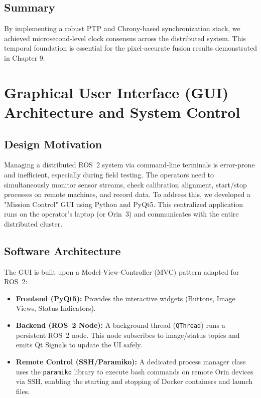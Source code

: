 \documentclass[12pt,a4paper]{report}
\begin{document}
\section{Summary}
By implementing a robust PTP and Chrony-based synchronization stack, we achieved microsecond-level clock consensus across the distributed system. This temporal foundation is essential for the pixel-accurate fusion results demonstrated in Chapter 9.

\chapter{Graphical User Interface (GUI) Architecture and System Control}

\section{Design Motivation}
Managing a distributed ROS~2 system via command-line terminals is error-prone and inefficient, especially during field testing. The operators need to simultaneously monitor sensor streams, check calibration alignment, start/stop processes on remote machines, and record data. To address this, we developed a "Mission Control" GUI using Python and PyQt5. This centralized application runs on the operator's laptop (or Orin~3) and communicates with the entire distributed cluster.

\section{Software Architecture}
The GUI is built upon a Model-View-Controller (MVC) pattern adapted for ROS~2:
\begin{itemize}
    \item \textbf{Frontend (PyQt5):} Provides the interactive widgets (Buttons, Image Views, Status Indicators).
    \item \textbf{Backend (ROS~2 Node):} A background thread (\texttt{QThread}) runs a persistent ROS~2 node. This node subscribes to image/status topics and emits Qt Signals to update the UI safely.
    \item \textbf{Remote Control (SSH/Paramiko):} A dedicated process manager class uses the \texttt{paramiko} library to execute bash commands on remote Orin devices via SSH, enabling the starting and stopping of Docker containers and launch files.
\end{itemize}
\end{document}
